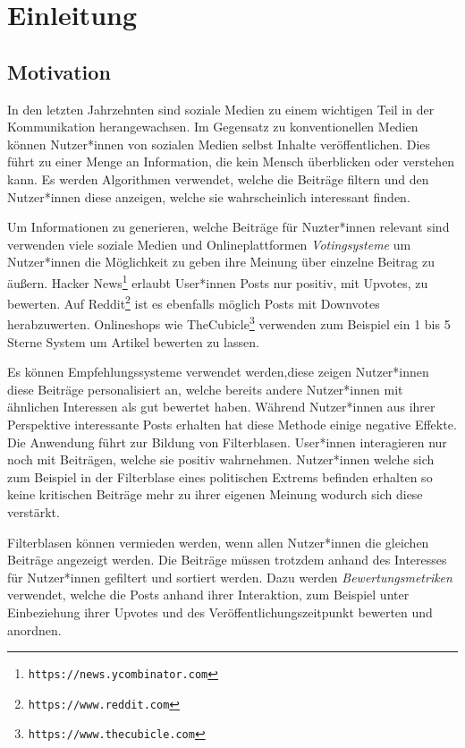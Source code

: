 \chapter{Einleitung}

\section{Motivation}

In den letzten Jahrzehnten sind soziale Medien zu einem wichtigen Teil in der Kommunikation herangewachsen. Im Gegensatz zu konventionellen Medien können Nutzer*innen von sozialen Medien selbst Inhalte veröffentlichen. Dies führt zu einer Menge an Information, die kein Mensch überblicken oder verstehen kann. Es werden Algorithmen verwendet, welche die Beiträge filtern und den Nutzer*innen diese anzeigen, welche sie wahrscheinlich interessant finden. 

Um Informationen zu generieren, welche Beiträge für Nuzter*innen relevant sind verwenden viele soziale Medien und Onlineplattformen \textit{Votingsysteme} um Nutzer*innen die Möglichkeit zu geben ihre Meinung über einzelne Beitrag zu äußern. Hacker News\footnote{\texttt{https://news.ycombinator.com}} erlaubt User*innen Posts nur positiv, mit Upvotes, zu bewerten. Auf Reddit\footnote{\texttt{https://www.reddit.com}} ist es ebenfalls möglich Posts mit Downvotes herabzuwerten. Onlineshops wie TheCubicle\footnote{\texttt{https://www.thecubicle.com}} verwenden zum Beispiel ein 1 bis 5 Sterne System um Artikel bewerten zu lassen.

Es können Empfehlungssysteme verwendet werden,diese zeigen Nutzer*innen diese Beiträge personalisiert an, welche bereits andere Nutzer*innen mit ähnlichen Interessen als gut bewertet haben. Während Nutzer*innen aus ihrer Perspektive interessante Posts erhalten hat diese Methode einige negative Effekte. Die Anwendung führt zur Bildung von Filterblasen. User*innen interagieren nur noch mit Beiträgen, welche sie positiv wahrnehmen. Nutzer*innen welche sich zum Beispiel in der Filterblase eines politischen Extrems befinden erhalten so keine kritischen Beiträge mehr zu ihrer eigenen Meinung wodurch sich diese verstärkt. 

Filterblasen können vermieden werden, wenn allen Nutzer*innen die gleichen Beiträge angezeigt werden. Die Beiträge müssen trotzdem anhand des Interesses für Nutzer*innen gefiltert und sortiert werden. Dazu werden \textit{Bewertungsmetriken} verwendet, welche die Posts anhand ihrer Interaktion, zum Beispiel unter Einbeziehung ihrer Upvotes und des Veröffentlichungszeitpunkt bewerten und anordnen.

